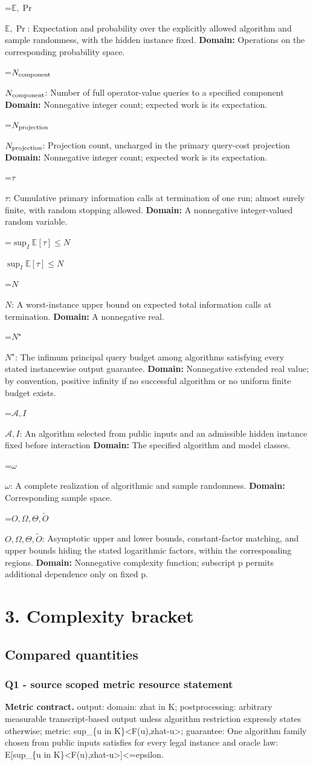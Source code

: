 \documentclass[10pt,a4paper]{article}
\newcommand{\AtlasMath}[1]{\par\begingroup\centering\setbox0=\hbox{$\displaystyle #1$}\ifdim\wd0>1.4\linewidth\typeout{ATLAS WIDE FORMULA: \the\wd0}\fi\ifdim\wd0>\linewidth\resizebox{\linewidth}{!}{\box0}\else\box0\fi\par\endgroup}
\newcommand{\AtlasInlineMath}[1]{\begingroup\setbox0=\hbox{$#1$}\ifdim\wd0>.4\linewidth\endgroup\AtlasMath{#1}\else\endgroup$#1$\fi}
\begin{document}
\AtlasInlineMath{\mathbb E,\Pr}: Expectation and probability over the explicitly allowed algorithm and sample randomness, with the hidden instance fixed. \textbf{Domain:} Operations on the corresponding probability space.

\AtlasInlineMath{N_{\rm component}}: Number of full operator-value queries to a specified component \textbf{Domain:} Nonnegative integer count; expected work is its expectation.

\AtlasInlineMath{N_{\rm projection}}: Projection count, uncharged in the primary query-cost projection \textbf{Domain:} Nonnegative integer count; expected work is its expectation.

\AtlasInlineMath{\tau}: Cumulative primary information calls at termination of one run; almost surely finite, with random stopping allowed. \textbf{Domain:} A nonnegative integer-valued random variable.

\AtlasInlineMath{\sup_I\mathbb E[\tau]\le N}

\AtlasInlineMath{N}: A worst-instance upper bound on expected total information calls at termination. \textbf{Domain:} A nonnegative real.

\AtlasInlineMath{N^\star}: The infimum principal query budget among algorithms satisfying every stated instancewise output guarantee. \textbf{Domain:} Nonnegative extended real value; by convention, positive infinity if no successful algorithm or no uniform finite budget exists.

\AtlasInlineMath{\mathcal A,I}: An algorithm selected from public inputs and an admissible hidden instance fixed before interaction \textbf{Domain:} The specified algorithm and model classes.

\AtlasInlineMath{\omega}: A complete realization of algorithmic and sample randomness. \textbf{Domain:} Corresponding sample space.

\AtlasInlineMath{O,\Omega,\Theta,\widetilde O}: Asymptotic upper and lower bounds, constant-factor matching, and upper bounds hiding the stated logarithmic factors, within the corresponding regions. \textbf{Domain:} Nonnegative complexity function; subscript p permits additional dependence only on fixed p.

\section{3. Complexity bracket}
\subsection{Compared quantities}
\subsubsection{Q1 - source scoped metric resource statement}
\textbf{Metric contract.} output: domain: zhat in K; postprocessing: arbitrary measurable transcript-based output unless algorithm restriction expressly states otherwise; metric: sup\_\{u in K\}<F(u),zhat-u>; guarantee: One algorithm family chosen from public inputs satisfies for every legal instance and oracle law: E[sup\_\{u in K\}<F(u),zhat-u>]<=epsilon.
\end{document}
